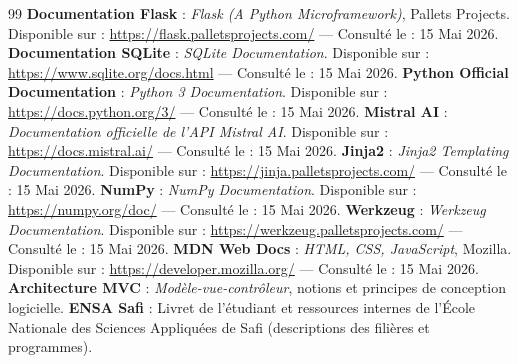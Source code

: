 \documentclass[a4paper,12pt]{article}
\begin{document}
\begin{thebibliography}{99}
     \textbf{Documentation Flask} : \textit{Flask (A Python Microframework)}, Pallets Projects. Disponible sur : \url{https://flask.palletsprojects.com/} — Consulté le : 15 Mai 2026.
     \textbf{Documentation SQLite} : \textit{SQLite Documentation}. Disponible sur : \url{https://www.sqlite.org/docs.html} — Consulté le : 15 Mai 2026.
     \textbf{Python Official Documentation} : \textit{Python 3 Documentation}. Disponible sur : \url{https://docs.python.org/3/} — Consulté le : 15 Mai 2026.
     \textbf{Mistral AI} : \textit{Documentation officielle de l'API Mistral AI}. Disponible sur : \url{https://docs.mistral.ai/} — Consulté le : 15 Mai 2026.
     \textbf{Jinja2} : \textit{Jinja2 Templating Documentation}. Disponible sur : \url{https://jinja.palletsprojects.com/} — Consulté le : 15 Mai 2026.
     \textbf{NumPy} : \textit{NumPy Documentation}. Disponible sur : \url{https://numpy.org/doc/} — Consulté le : 15 Mai 2026.
     \textbf{Werkzeug} : \textit{Werkzeug Documentation}. Disponible sur : \url{https://werkzeug.palletsprojects.com/} — Consulté le : 15 Mai 2026.
     \textbf{MDN Web Docs} : \textit{HTML, CSS, JavaScript}, Mozilla. Disponible sur : \url{https://developer.mozilla.org/} — Consulté le : 15 Mai 2026.
     \textbf{Architecture MVC} : \textit{Modèle-vue-contrôleur}, notions et principes de conception logicielle.
     \textbf{ENSA Safi} : Livret de l'étudiant et ressources internes de l'École Nationale des Sciences Appliquées de Safi (descriptions des filières et programmes).
\end{thebibliography}
\end{document}
